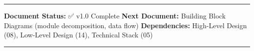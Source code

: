 \documentclass[
]{article}
\begin{document}
\begin{center}\rule{0.5\linewidth}{0.5pt}\end{center}

\textbf{Document Status:} ✅ v1.0 Complete \textbf{Next Document:}
Building Block Diagrams (module decomposition, data flow)
\textbf{Dependencies:} High-Level Design (08), Low-Level Design (14),
Technical Stack (05)

\begin{center}\rule{0.5\linewidth}{0.5pt}\end{center}
\end{document}
